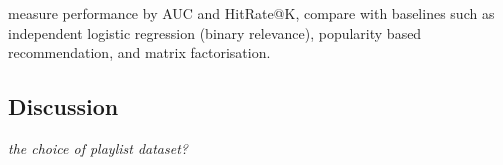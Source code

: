 \begin{table}[!h]
\centering
\caption{Empirical results}
\end{table}



\TODO
measure performance by AUC and HitRate@K,
compare with baselines such as independent logistic regression (\ie binary relevance), popularity based recommendation,
and matrix factorisation.



\subsection{Discussion}

{\it the choice of playlist dataset?}
